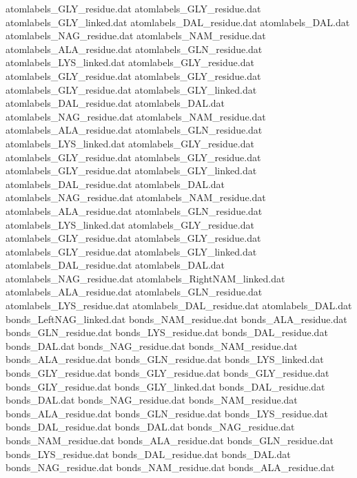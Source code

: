 atomlabels_GLY_residue.dat
atomlabels_GLY_residue.dat
atomlabels_GLY_linked.dat
atomlabels_DAL_residue.dat      
atomlabels_DAL.dat              
atomlabels_NAG_residue.dat      
atomlabels_NAM_residue.dat      
atomlabels_ALA_residue.dat      
atomlabels_GLN_residue.dat      
atomlabels_LYS_linked.dat       
atomlabels_GLY_residue.dat
atomlabels_GLY_residue.dat
atomlabels_GLY_residue.dat
atomlabels_GLY_residue.dat
atomlabels_GLY_linked.dat
atomlabels_DAL_residue.dat      
atomlabels_DAL.dat              
atomlabels_NAG_residue.dat      
atomlabels_NAM_residue.dat      
atomlabels_ALA_residue.dat      
atomlabels_GLN_residue.dat      
atomlabels_LYS_linked.dat       
atomlabels_GLY_residue.dat
atomlabels_GLY_residue.dat
atomlabels_GLY_residue.dat
atomlabels_GLY_residue.dat
atomlabels_GLY_linked.dat
atomlabels_DAL_residue.dat      
atomlabels_DAL.dat              
atomlabels_NAG_residue.dat      
atomlabels_NAM_residue.dat      
atomlabels_ALA_residue.dat      
atomlabels_GLN_residue.dat      
atomlabels_LYS_linked.dat       
atomlabels_GLY_residue.dat
atomlabels_GLY_residue.dat
atomlabels_GLY_residue.dat
atomlabels_GLY_residue.dat
atomlabels_GLY_linked.dat
atomlabels_DAL_residue.dat      
atomlabels_DAL.dat              
atomlabels_NAG_residue.dat      
atomlabels_RightNAM_linked.dat  
atomlabels_ALA_residue.dat      
atomlabels_GLN_residue.dat      
atomlabels_LYS_residue.dat      
atomlabels_DAL_residue.dat      
atomlabels_DAL.dat              
bonds_LeftNAG_linked.dat        
bonds_NAM_residue.dat           
bonds_ALA_residue.dat           
bonds_GLN_residue.dat           
bonds_LYS_residue.dat           
bonds_DAL_residue.dat           
bonds_DAL.dat                   
bonds_NAG_residue.dat           
bonds_NAM_residue.dat           
bonds_ALA_residue.dat           
bonds_GLN_residue.dat           
bonds_LYS_linked.dat            
bonds_GLY_residue.dat
bonds_GLY_residue.dat
bonds_GLY_residue.dat
bonds_GLY_residue.dat
bonds_GLY_linked.dat
bonds_DAL_residue.dat           
bonds_DAL.dat                   
bonds_NAG_residue.dat           
bonds_NAM_residue.dat           
bonds_ALA_residue.dat           
bonds_GLN_residue.dat           
bonds_LYS_residue.dat           
bonds_DAL_residue.dat           
bonds_DAL.dat                   
bonds_NAG_residue.dat           
bonds_NAM_residue.dat           
bonds_ALA_residue.dat           
bonds_GLN_residue.dat           
bonds_LYS_residue.dat           
bonds_DAL_residue.dat           
bonds_DAL.dat                   
bonds_NAG_residue.dat           
bonds_NAM_residue.dat           
bonds_ALA_residue.dat           
